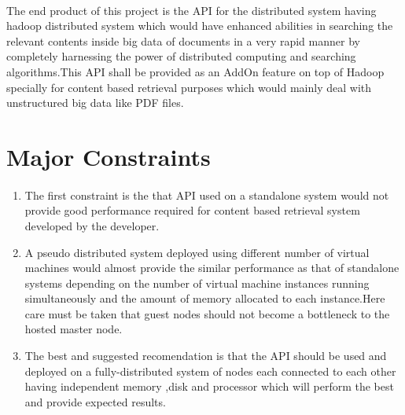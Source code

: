 \documentclass[oneside,a4paper,12pt]{report}
\begin{document}
\paragraph{}
The end product of this project is the API for the distributed system having hadoop distributed system which would have enhanced abilities in searching the relevant contents inside big data of documents in a very rapid manner by completely harnessing the power of distributed computing and searching algorithms.This API shall be provided as an AddOn feature on top of Hadoop specially for content based retrieval purposes which would mainly deal with unstructured big data like PDF files.

\section{Major Constraints}
\paragraph{}
\begin{enumerate}
\item The first constraint is the that API used on a standalone system would not provide good performance required for content based retrieval system developed by the developer.
\item A pseudo distributed system deployed using different number of virtual machines would almost provide the similar performance as that of standalone systems depending on the number of virtual machine instances running simultaneously and the amount of memory allocated to each instance.Here care must be taken that guest nodes should not become a bottleneck to the hosted master node.
\item The best and suggested recomendation is that the API should be used and deployed on a fully-distributed system of nodes each connected to each other having independent memory ,disk and processor which will perform the best and provide expected results.
\end{enumerate}
\end{document}
